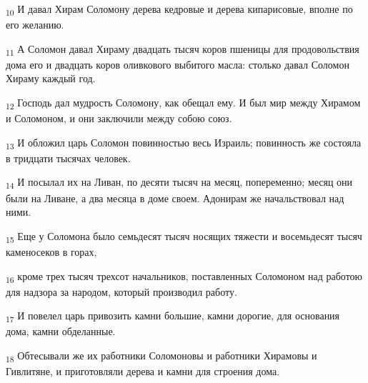 \begin{tcolorbox}
\textsubscript{10} И давал Хирам Соломону дерева кедровые и дерева кипарисовые, вполне по его желанию.
\end{tcolorbox}
\begin{tcolorbox}
\textsubscript{11} А Соломон давал Хираму двадцать тысяч коров пшеницы для продовольствия дома его и двадцать коров оливкового выбитого масла: столько давал Соломон Хираму каждый год.
\end{tcolorbox}
\begin{tcolorbox}
\textsubscript{12} Господь дал мудрость Соломону, как обещал ему. И был мир между Хирамом и Соломоном, и они заключили между собою союз.
\end{tcolorbox}
\begin{tcolorbox}
\textsubscript{13} И обложил царь Соломон повинностью весь Израиль; повинность же состояла в тридцати тысячах человек.
\end{tcolorbox}
\begin{tcolorbox}
\textsubscript{14} И посылал их на Ливан, по десяти тысяч на месяц, попеременно; месяц они были на Ливане, а два месяца в доме своем. Адонирам же начальствовал над ними.
\end{tcolorbox}
\begin{tcolorbox}
\textsubscript{15} Еще у Соломона было семьдесят тысяч носящих тяжести и восемьдесят тысяч каменосеков в горах,
\end{tcolorbox}
\begin{tcolorbox}
\textsubscript{16} кроме трех тысяч трехсот начальников, поставленных Соломоном над работою для надзора за народом, который производил работу.
\end{tcolorbox}
\begin{tcolorbox}
\textsubscript{17} И повелел царь привозить камни большие, камни дорогие, для основания дома, камни обделанные.
\end{tcolorbox}
\begin{tcolorbox}
\textsubscript{18} Обтесывали же их работники Соломоновы и работники Хирамовы и Гивлитяне, и приготовляли дерева и камни для строения дома.
\end{tcolorbox}
